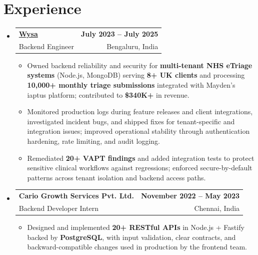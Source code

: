 \documentclass[letterpaper,10pt]{article}
\makeatletter
\newcommand{\resumeItem}[1]{
  \item\small{#1\vspace{-1pt}}
}
\newcommand{\resumeSubheading}[4]{
  \vspace{1pt}\item
    \begin{tabular*}{0.985\textwidth}[t]{l@{\extracolsep{\fill}}r}
      \textbf{#1} & \textbf{\small #2} \\
      {\small\color{ResumeSlate} #3} & {\small\color{ResumeSlate} #4} \\
    \end{tabular*}\vspace{-6pt}
}
\newcommand{\resumeSubHeadingListStart}{\begin{itemize}[leftmargin=0.0in, label={}, itemsep=2pt, topsep=2pt]}
\newcommand{\resumeSubHeadingListEnd}{\end{itemize}}
\newcommand{\resumeItemListStart}{\begin{itemize}[leftmargin=0.18in, itemsep=2pt, topsep=1pt]}
\newcommand{\resumeItemListEnd}{\end{itemize}\vspace{-4pt}}
\makeatother
\begin{document}
\section{Experience}
\resumeSubHeadingListStart
  \resumeSubheading
    {\href{https://www.wysa.io}{Wysa}}{July 2023 -- July 2025}
    {Backend Engineer}{Bengaluru, India}
    \resumeItemListStart
      \resumeItem{Owned backend reliability and security for \textbf{multi-tenant NHS eTriage systems} (Node.js, MongoDB) serving \textbf{8+ UK clients} and processing \textbf{10{,}000+ monthly triage submissions} integrated with Mayden's iaptus platform; contributed to \textbf{\$340K+} in revenue.}
      \resumeItem{Monitored production logs during feature releases and client integrations, investigated incident bugs, and shipped fixes for tenant-specific and integration issues; improved operational stability through authentication hardening, rate limiting, and audit logging.}
      \resumeItem{Remediated \textbf{20+ VAPT findings} and added integration tests to protect sensitive clinical workflows against regressions; enforced secure-by-default patterns across tenant isolation and backend access paths.}
    \resumeItemListEnd
  \resumeSubheading
    {Cario Growth Services Pvt. Ltd.}{November 2022 -- May 2023}
    {Backend Developer Intern}{Chennai, India}
    \resumeItemListStart
      \resumeItem{Designed and implemented \textbf{20+ RESTful APIs} in Node.js + Fastify backed by \textbf{PostgreSQL}, with input validation, clear contracts, and backward-compatible changes used in production by the frontend team.}
    \resumeItemListEnd
\resumeSubHeadingListEnd
\vspace{-4pt}
\end{document}
